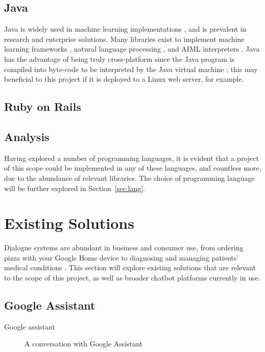 \subsection{Java}
Java is widely used in machine learning implementations \cite{witten2005practical} \cite{abeel2009java}, and is prevalent in research and enterprise solutions. Many libraries exist to implement machine learning frameworks \cite{kovalev2016deep}, natural language processing \cite{nltk2019}, and AIML interpreters \cite{alice2013}. Java has the advantage of being truly cross-platform since the Java program is compiled into byte-code to be interpreted by the Java virtual machine \cite{witten2005practical}; this may beneficial to this project if it is deployed to a Linux web server, for example.\\

\subsection{Ruby on Rails}


\subsection{Analysis}
Having explored a number of programming languages, it is evident that a project of this scope could be implemented in any of these languages, and countless more, due to the abundance of relevant libraries. The choice of programming language will be further explored in Section~\ref{sec:lang}.

\cleardoublepage
\section{Existing Solutions}
\label{sec:existing}
Dialogue systems are abundant in business and consumer use, from ordering pizza with your Google Home device \cite{google2018dominos} to diagnosing and managing patients’ medical conditions \cite{yourmd2017}. This section will explore existing solutions that are relevant to the scope of this project, as well as broader chatbot platforms currently in use.

\subsection{Google Assistant}
Google assistant

\begin{figure}[h]
	\centering
    \qquad
	\caption{A conversation with Google Assistant}
	\label{fig:assistant}
\end{figure}

